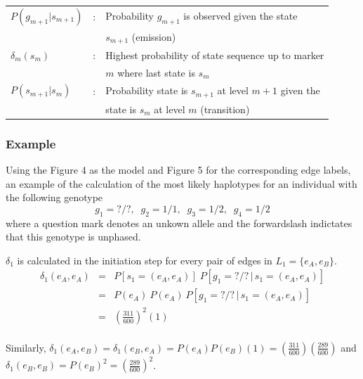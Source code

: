 \documentclass[a4paper,11pt,twoside,abstraction,titlepage]{article}
\begin{document}
\begin{framed}
\begin{tabular}{lll}
\hspace{-20pt} $P(g_{m+1}|s_{m+1})$ &:& \hspace{-5pt} Probability $g_{m+1}$ is observed given the state \\
&& $s_{m+1}$ (emission) \\
\hspace{-20pt}  $\delta_m(s_m)$ &:& \hspace{-5pt} Highest probability of state sequence up to marker \\
&& $m$ where last state is $s_m$\\ 
\hspace{-20pt} $P(s_{m+1}|s_m)$ &:& Probability state is $s_{m+1}$ at level $m+1$ given the \\
&& state is $s_m$ at level $m$ (transition)
\end{tabular}
\end{framed}

\newpage
\subsubsection{Example}
Using the Figure 4 as the model and Figure 5 for the corresponding edge labels, an example of the calculation of the most likely haplotypes for an individual with the following genotype
\begin{equation*}
g_1 = ?/?, \;\; g_2 = 1/1, \;\; g_3 = 1/2, \;\; g_4 = 1/2
\end{equation*}
where a question mark denotes an unkown allele and the forwardslash indictates that this genotype is unphased.
\vspace{10pt}

\noindent $\delta_1$ is calculated in the initiation step for every pair of edges in $L_1 = \{e_{A}, e_{B}\}$.
\begin{eqnarray*}
\delta_1(e_A,e_A) &=& P[s_1 = (e_A, e_A)] \; P[g_1=?/? \, | \, s_1 = (e_A,e_A)] \\
&=& P(e_A) \: P(e_A) \: P[g_1=?/? \, | \, s_1 = (e_A,e_A)] \\
&=& \left(\frac{311}{600}\right)^2\!\!(1)  \\
\end{eqnarray*}
\vspace{-20pt}

\noindent Similarly, $\delta_1(e_A,e_B)  = \delta_1(e_B,e_A)  = P(e_A)P(e_B)(1) = \left(\frac{311}{600}\right)\!\left(\frac{289}{600}\right)$ 
and $\delta_1(e_B,e_B) = P(e_B)^2 = \left(\frac{289}{600}\right)^2$.
\end{document}
